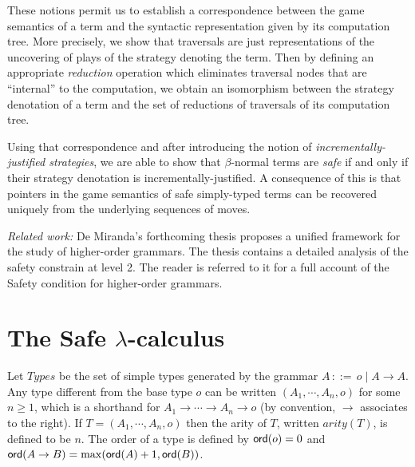 \documentclass{llncs}
\newcommand\ord[1]{{\sf ord}(#1)}
\newcommand\rank[1]{{\sf rank}(#1)}
\newcommand{\funsp}{\rightarrow}
\begin{document}
These notions permit us to establish a correspondence between the game semantics of a term and
the syntactic representation given by its computation tree.
More precisely, we show that traversals are just representations of the
uncovering of plays of the strategy denoting the term.
Then by defining an appropriate \emph{reduction} operation which eliminates traversal
nodes that are ``internal'' to the computation, we obtain an
isomorphism between the strategy denotation of a term and the set of
reductions of traversals of its computation tree.



Using that correspondence and after introducing the notion of \emph{incrementally-justified
strategies}, we are able to show that $\beta$-normal terms are \emph{safe} if and only if
their strategy denotation is incrementally-justified.
A consequence of this is that pointers in the game semantics of safe simply-typed terms can be recovered uniquely from the underlying sequences of moves.

\vspace{1cm}

\emph{Related work:} De Miranda's forthcoming thesis \cite{demirandathesis} proposes a unified framework for the study of higher-order grammars. The thesis contains a detailed analysis of the safety constrain at level 2. The reader is referred to it for a full account of the Safety condition for higher-order grammars.


\section{The Safe $\lambda$-calculus}
Let $Types$ be the set of simple types generated by the grammar $A
\, ::= \, o \; | \; A \funsp A$. Any type different from the base
type $o$ can be written $(A_1, \cdots, A_n, o)$ for some $n \geq 1$,
which is a shorthand for $A_1 \funsp \cdots \funsp A_n \funsp o$ (by
convention, $\rightarrow$ associates to the right). If $T=(A_1,
\cdots, A_n, o)$ then the arity of $T$, written $arity(T)$, is
defined to be $n$.
The order of a type is defined by $\ord{o} = 0$ and
$\ord{A \funsp B} = \max(\ord{A}+1, \ord{B})$.

\end{document}
